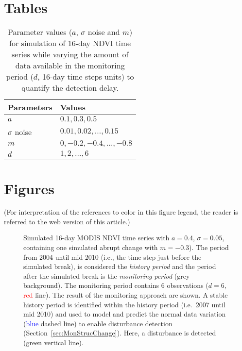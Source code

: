 \documentclass[authoryear,preprint,review,10pt]{elsarticle}
\begin{document}


\newpage

\section*{Tables}

\begin{table}[htb]
\caption{Parameter values ($a$, $\sigma$ noise and $m$) for simulation of 16-day NDVI time series while varying the amount of data available in the monitoring period ($d$, 16-day time steps units) to quantify the detection delay.}
\centering
\begin{tabular}{ll}
  \hline
  Parameters & Values \\ [0.5ex]
  \hline
  $a$         & $0.1, 0.3, 0.5$ \\
  $\sigma$ noise    & $0.01,0.02,\dots,0.15$ \\
  $m$         & $0, -0.2, -0.4, \dots, -0.8$ \\
  $d$   & $1, 2, \dots, 6$ \\ [.5ex]
  \hline
\end{tabular}
\label{table:simpar}
\end{table}

\newpage

\section*{Figures}

 (For interpretation of the references to color in this figure legend, the reader is referred to the web
 version of this article.)

 \begin{figure}[htp]
\centering
  \caption{Simulated 16-day MODIS NDVI time series with $a = 0.4$, $\sigma = 0.05$, containing one simulated abrupt change with $m = -0.3$). The period from
  2004 until mid 2010 (i.e., the time step just before the simulated break), is considered the \emph{history period} and the period after the simulated
  break is the \emph{monitoring period} (grey background). The monitoring period contains 6 observations  ($d = 6$, \textcolor{red} {red} line). The
  result of the monitoring approach are shown. A stable history period is identified within the history period (i.e.\ 2007 until mid 2010) and used to model
  and predict the normal data variation (\textcolor{blue} {blue} dashed line) to enable disturbance detection (Section~\ref{sec:MonStrucChange}).  Here, a
  disturbance is detected (\textcolor{OliveGreen} {green} vertical line).}
  \label{fig:SimMonitor}
\end{figure}
\end{document}
